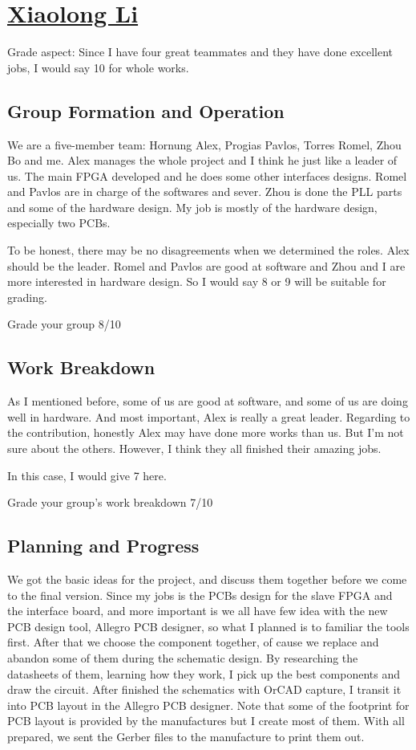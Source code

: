\section{\texorpdfstring{\href{mailto:xl1g11@ecs.soton.ac.uk}{Xiaolong Li}} {Xiaolong Li}}


Grade aspect: Since I have four great teammates and they have done excellent jobs, I would say 10 for whole works.

\subsection{Group Formation and Operation}

We are a five-member team: Hornung Alex, Progias Pavlos, Torres Romel, Zhou Bo and me. Alex manages the whole project and I think he just like a leader of us. The main FPGA developed and he does some other interfaces designs. Romel and Pavlos are in charge of the softwares and sever. Zhou is done the PLL parts and some of the hardware design. My job is mostly of the hardware design, especially two PCBs.

To be honest, there may be no disagreements when we determined the roles. Alex should be the leader. Romel and Pavlos are good at software and Zhou and I are more interested in hardware design. So I would say 8 or 9 will be suitable for grading.

Grade your group 	8/10


\subsection{Work Breakdown}

As I mentioned before, some of us are good at software, and some of us are doing well in hardware. And most important, Alex is really a great leader. Regarding to the contribution, honestly Alex may have done more works than us. But I’m not sure about the others. However, I think they all finished their amazing jobs.

In this case, I would give 7 here.

Grade your group’s work breakdown		7/10


\subsection{Planning and Progress}

We got the basic ideas for the project, and discuss them together before we come to the final version. Since my jobs is the PCBs design for the slave FPGA and the interface board, and more important is we all have few idea with the new PCB design tool, Allegro PCB designer, so what I planned is to familiar the tools first. After that we choose the component together, of cause we replace and abandon some of them during the schematic design. By researching the datasheets of them, learning how they work, I pick up the best components and draw the circuit. After finished the schematics with OrCAD capture, I transit it into PCB layout in the Allegro PCB designer. Note that some of the footprint for PCB layout is provided by the manufactures but I create most of them. With all prepared, we sent the Gerber files to the manufacture to print them out.

